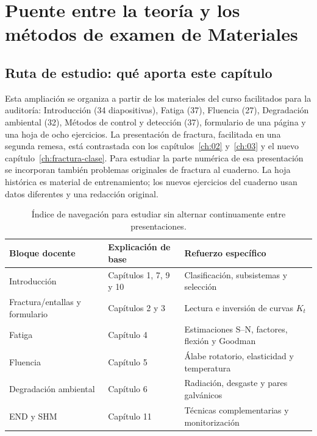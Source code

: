 \chapter{Puente entre la teoría y los métodos de examen de Materiales}
\label{ch:puente-materiales}

\section{Ruta de estudio: qué aporta este capítulo}
Esta ampliación se organiza a partir de los materiales del curso facilitados para la auditoría: Introducción (34 diapositivas), Fatiga (37), Fluencia (27), Degradación ambiental (32), Métodos de control y detección (37), formulario de una página y una hoja de ocho ejercicios. La presentación de fractura, facilitada en una segunda remesa, está contrastada con los capítulos~\ref{ch:02} y~\ref{ch:03} y el nuevo capítulo~\ref{ch:fractura-clase}. Para estudiar la parte numérica de esa presentación se incorporan también problemas originales de fractura al cuaderno. La hoja histórica es material de entrenamiento; los nuevos ejercicios del cuaderno usan datos diferentes y una redacción original.

\begin{table}[htbp]\centering\small
\caption{Índice de navegación para estudiar sin alternar continuamente entre presentaciones.}\label{tab:puente-ruta}
\begin{tabular}{p{.29\linewidth}p{.30\linewidth}p{.31\linewidth}}\toprule
Bloque docente & Explicación de base & Refuerzo específico\\\midrule
Introducción & Capítulos 1, 7, 9 y 10 & Clasificación, subsistemas y selección\\
Fractura/entallas y formulario & Capítulos 2 y 3 & Lectura e inversión de curvas $K_t$\\
Fatiga & Capítulo 4 & Estimaciones S--N, factores, flexión y Goodman\\
Fluencia & Capítulo 5 & Álabe rotatorio, elasticidad y temperatura\\
Degradación ambiental & Capítulo 6 & Radiación, desgaste y pares galvánicos\\
END y SHM & Capítulo 11 & Técnicas complementarias y monitorización\\\bottomrule
\end{tabular}
\end{table}

